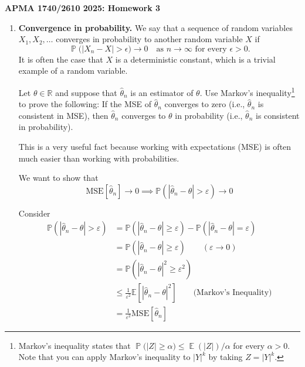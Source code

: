 \documentclass[11pt]{report}
\DeclareMathOperator{\Prob}{\mathbb{P}}
\DeclareMathOperator{\Exp}{\mathbb{E}}
\newcommand{\E}{\mathbb{E}}
\renewcommand{\P}{\mathbb{P}}
\newcommand{\ep}{\varepsilon}
\newcommand{\abs}[1]{\left\lvert#1\right\rvert}
\begin{document}
\begin{center}
    {\bf\large APMA 1740/2610 2025: Homework 3}
\end{center}
\medskip


\begin{enumerate}[1.]





    \item {\bf Convergence in probability.} We say that a sequence of random variables $X_1,X_2,\dotsc$ converges in probability to another random variable $X$ if
          \[ \Prob\bigl(|X_n-X| > \epsilon\bigr) \to 0 \quad \text{as $n\to\infty$ for every $\epsilon > 0$}. \]
          It is often the case that $X$ is a deterministic constant, which is a trivial example of a random variable.

          Let $\theta\in\mathbb{R}$ and suppose that $\widehat\theta_n$ is an estimator of $\theta$.  Use Markov's inequality\footnote{Markov's inequality states that $\Prob\bigl(|Z| \geq \alpha\bigl) \leq \Exp(|Z|)/\alpha$ for every $\alpha > 0$.  Note that you can apply Markov's inequality to $|Y|^k$ by taking $Z=|Y|^k$.}  to prove the following: If the MSE of $\widehat\theta_n$ converges to zero (i.e., $\widehat\theta_n$ is consistent in MSE), then $\widehat\theta_n$ converges to $\theta$ in probability (i.e., $\widehat\theta_n$ is consistent in probability).

          This is a very useful fact because working with expectations (MSE) is often much easier than working with probabilities.



          \color{blue}
          We want to show that
          \[\text{MSE}[\hat \theta_n] \to 0 \implies \P(\abs{\hat \theta_n - \theta} > \ep) \to 0\]

          Consider
          \begin{align*}
              \P(\abs{\hat\theta_n - \theta} > \ep) & = \P(\abs{\hat \theta_n - \theta} \geq \ep) - \P(\abs{\hat \theta_n - \theta} = \ep)        \\
                                                    & =  \P(\abs{\hat \theta_n - \theta} \geq \ep)  \qquad (\ep \to 0)                            \\
                                                    & = \P(\abs{\hat \theta_n - \theta}^2 \geq \ep^2)                                             \\
                                                    & \leq \frac{1}{\ep^2} \E[\abs{\hat \theta_n - \theta}^2] \qquad \text{(Markov's Inequality)} \\
                                                    & = \frac{1}{\ep^2} \text{MSE}[\hat \theta_n]
          \end{align*}


\end{enumerate}
\end{document}
